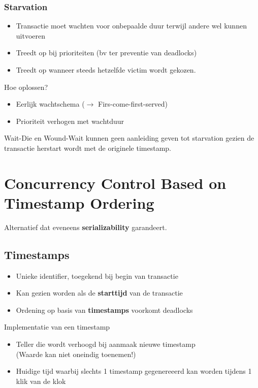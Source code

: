 \subsubsection{Starvation}
\begin{itemize}
	\item Transactie moet wachten voor onbepaalde duur terwijl andere wel kunnen uitvoeren
	\item Treedt op bij prioriteiten (bv ter preventie van deadlocks)
	\item Treedt op wanneer steeds hetzelfde victim wordt gekozen.
\end{itemize}
Hoe oplossen?
\begin{itemize}
	\item Eerlijk wachtschema ($\rightarrow$ Firs-come-first-served)
	\item Prioriteit verhogen met wachtduur
\end{itemize}
Wait-Die en Wound-Wait kunnen geen aanleiding geven tot starvation gezien de transactie herstart wordt met de originele timestamp.



\section{Concurrency Control Based on Timestamp Ordering}%
Alternatief dat eveneens \textbf{serializability} garandeert.


\subsection{Timestamps}%
\begin{itemize}
	\item Unieke identifier, toegekend bij begin van transactie
	\item Kan gezien worden als de \textbf{starttijd} van de transactie
	\item Ordening op basis van \textbf{timestamps} voorkomt deadlocks
\end{itemize}
Implementatie van een timestamp
\begin{itemize}
	\item Teller die wordt verhoogd bij aanmaak nieuwe timestamp \\
	(Waarde kan niet oneindig toenemen!)
	\item Huidige tijd waarbij slechts 1 timestamp gegenereeerd kan worden tijdens 1 klik van de klok
\end{itemize}


